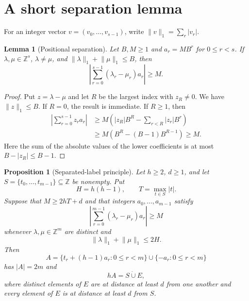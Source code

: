 \documentclass[11pt]{article}
\newtheorem{lemma}{Lemma}
\newtheorem{proposition}{Proposition}
\newcommand{\Z}{\mathbb{Z}}
\begin{document}
\section{A short separation lemma}

For an integer vector $v=(v_0,\ldots,v_{s-1})$, write
$\lVert v\rVert_1=\sum_r |v_r|$.

\begin{lemma}[Positional separation]\label{lem:separation}
Let $B,M\geq 1$ and $a_r=MB^r$ for $0\leq r<s$. If
$\lambda,\mu\in\Z^s$, $\lambda\neq\mu$, and
$\lVert\lambda\rVert_1+\lVert\mu\rVert_1\leq B$, then
\[
 \left|\sum_{r=0}^{s-1}(\lambda_r-\mu_r)a_r\right|\geq M.
\]
\end{lemma}

\begin{proof}
Put $z=\lambda-\mu$ and let $R$ be the largest index with $z_R\neq 0$.
We have $\lVert z\rVert_1\leq B$. If $R=0$, the result is immediate. If
$R\geq 1$, then
\begin{align*}
\left|\sum_{r=0}^{s-1}z_ra_r\right|
&\geq M\left(|z_R|B^R-\sum_{r<R}|z_r|B^r\right)\\
&\geq M\left(B^R-(B-1)B^{R-1}\right)
\geq M.
\end{align*}
Here the sum of the absolute values of the lower coefficients is at most
$B-|z_R|\leq B-1$.
\end{proof}

\begin{proposition}[Separated-label principle]\label{prop:labels}
Let $h\geq 2$, $d\geq 1$, and let
$S=\{t_0,\ldots,t_{m-1}\}\subseteq\Z$ be nonempty. Put
\[
 H=h(h-1),
 \qquad
 T=\max_{t\in S}|t|.
\]
Suppose that $M\geq 2hT+d$ and that integers $a_0,\ldots,a_{m-1}$ satisfy
\[
 \left|\sum_{r=0}^{m-1}(\lambda_r-\mu_r)a_r\right|\geq M
 \tag{1}\label{eq:abstract-separation}
\]
whenever $\lambda,\mu\in\Z^m$ are distinct and
\[
 \lVert\lambda\rVert_1+\lVert\mu\rVert_1\leq 2H.
\]
Then
\[
 A=\{t_r+(h-1)a_r:0\leq r<m\}\cup\{-a_r:0\leq r<m\}
\]
has $|A|=2m$ and
\[
 hA=S\mathbin{\dot\cup}E,
\]
where distinct elements of $E$ are at distance at least $d$ from one another
and every element of $E$ is at distance at least $d$ from $S$.
\end{proposition}
\end{document}
